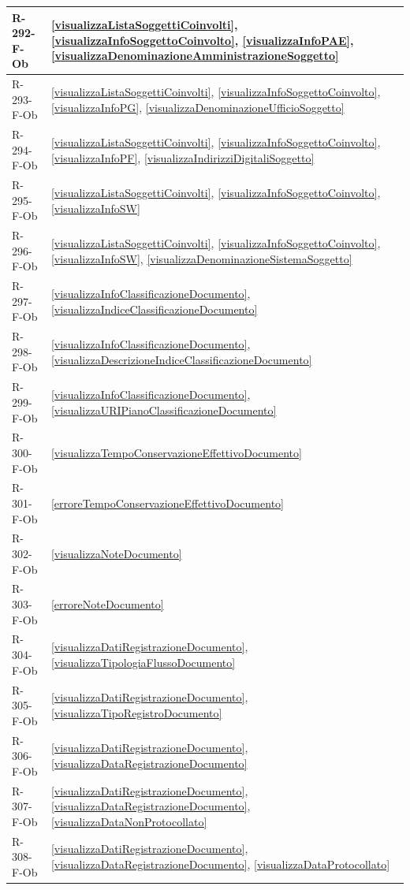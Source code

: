 \begin{longtable}{|p{4cm}|p{10cm}|}
\hline
R-292-F-Ob & \ref{visualizzaListaSoggettiCoinvolti}, \ref{visualizzaInfoSoggettoCoinvolto}, \ref{visualizzaInfoPAE}, \ref{visualizzaDenominazioneAmministrazioneSoggetto} \\
\hline
R-293-F-Ob & \ref{visualizzaListaSoggettiCoinvolti}, \ref{visualizzaInfoSoggettoCoinvolto}, \ref{visualizzaInfoPG}, \ref{visualizzaDenominazioneUfficioSoggetto} \\
\hline
R-294-F-Ob & \ref{visualizzaListaSoggettiCoinvolti}, \ref{visualizzaInfoSoggettoCoinvolto}, \ref{visualizzaInfoPF}, \ref{visualizzaIndirizziDigitaliSoggetto} \\
\hline
R-295-F-Ob & \ref{visualizzaListaSoggettiCoinvolti}, \ref{visualizzaInfoSoggettoCoinvolto}, \ref{visualizzaInfoSW} \\
\hline
R-296-F-Ob & \ref{visualizzaListaSoggettiCoinvolti}, \ref{visualizzaInfoSoggettoCoinvolto}, \ref{visualizzaInfoSW}, \ref{visualizzaDenominazioneSistemaSoggetto} \\
\hline
R-297-F-Ob & \ref{visualizzaInfoClassificazioneDocumento}, \ref{visualizzaIndiceClassificazioneDocumento} \\
\hline
R-298-F-Ob & \ref{visualizzaInfoClassificazioneDocumento}, \ref{visualizzaDescrizioneIndiceClassificazioneDocumento} \\
\hline
R-299-F-Ob & \ref{visualizzaInfoClassificazioneDocumento}, \ref{visualizzaURIPianoClassificazioneDocumento} \\
\hline
R-300-F-Ob & \ref{visualizzaTempoConservazioneEffettivoDocumento} \\
\hline
R-301-F-Ob & \ref{erroreTempoConservazioneEffettivoDocumento} \\
\hline
R-302-F-Ob & \ref{visualizzaNoteDocumento} \\
\hline
R-303-F-Ob & \ref{erroreNoteDocumento} \\
\hline
R-304-F-Ob & \ref{visualizzaDatiRegistrazioneDocumento}, \ref{visualizzaTipologiaFlussoDocumento} \\
\hline
R-305-F-Ob & \ref{visualizzaDatiRegistrazioneDocumento}, \ref{visualizzaTipoRegistroDocumento} \\
\hline
R-306-F-Ob & \ref{visualizzaDatiRegistrazioneDocumento}, \ref{visualizzaDataRegistrazioneDocumento} \\
\hline
R-307-F-Ob & \ref{visualizzaDatiRegistrazioneDocumento}, \ref{visualizzaDataRegistrazioneDocumento}, \ref{visualizzaDataNonProtocollato} \\
\hline
R-308-F-Ob & \ref{visualizzaDatiRegistrazioneDocumento}, \ref{visualizzaDataRegistrazioneDocumento}, \ref{visualizzaDataProtocollato} \\

\end{longtable}
